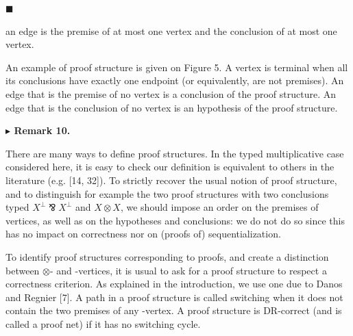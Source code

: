  
 
\par\noindent  $\blacksquare$ 
 
an edge is the premise of at most one vertex and the conclusion of at most one vertex.\par
 
 
  
 
 
An example of proof structure is given on Figure 5. A vertex is terminal when all its conclusions have exactly one endpoint (or equivalently, are not premises). An edge that is the premise of no vertex is a conclusion of the proof structure. An edge that is the conclusion of no vertex is an hypothesis of the proof structure.\par
 
 
 
\par\medskip\noindent\textbf{$\blacktriangleright$ Remark 10.}\par
 
 
There are many ways to define proof structures. In the typed multiplicative case considered here, it is easy to check our definition is equivalent to others in the literature (e.g. [14, 32]). To strictly recover the usual notion of proof structure, and to distinguish for example the two proof structures with two conclusions typed $X^{\perp}\invamp X^{\perp}$ and $X\otimes X$, we should impose an order on the premises of vertices, as well as on the hypotheses and conclusions: we do not do so since this has no impact on correctness nor on (proofs of) sequentialization.\par
 
 
 
 
To identify proof structures corresponding to proofs, and create a distinction between $\otimes$- and -vertices, it is usual to ask for a proof structure to respect a correctness criterion. As explained in the introduction, we use one due to Danos and Regnier [7]. A path in a proof structure is called switching when it does not contain the two premises of any -vertex. A proof structure is DR-correct (and is called a proof net) if it has no switching cycle.\par
 
